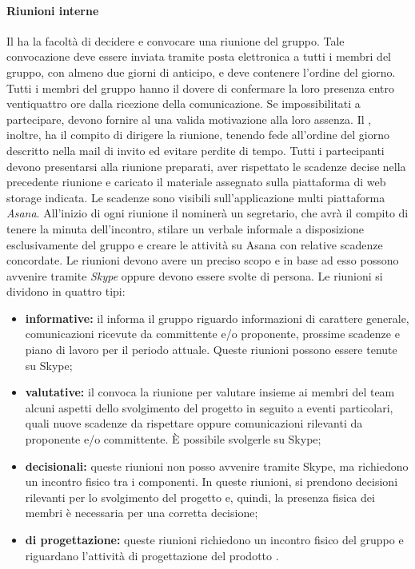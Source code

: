 			\paragraph{Riunioni interne}
			Il \textit{\RdP} ha la facoltà di decidere e convocare una riunione del gruppo. Tale convocazione deve essere inviata tramite posta elettronica a tutti i membri del gruppo, con almeno due giorni di anticipo, e deve contenere l'ordine del giorno. Tutti i membri del gruppo hanno il dovere di confermare la loro presenza entro ventiquattro ore dalla ricezione della comunicazione. Se impossibilitati a partecipare, devono fornire al \textit{\RdP} una valida motivazione alla loro assenza. Il \textit{\RdP}, inoltre, ha il compito di dirigere la riunione, tenendo fede all'ordine del giorno descritto nella mail di invito ed evitare perdite di tempo. Tutti i partecipanti devono presentarsi alla riunione preparati, aver rispettato le scadenze decise nella precedente riunione e caricato il materiale assegnato sulla piattaforma di web storage indicata. Le scadenze sono visibili sull'applicazione multi piattaforma \textit{Asana}.
			All’inizio di ogni riunione il \textit{\RdP} nominerà un segretario, che avrà il compito di tenere la minuta dell'incontro, stilare un verbale informale a disposizione esclusivamente del gruppo e creare le attività su Asana con relative scadenze concordate.  
			Le riunioni devono avere un preciso scopo e in base ad esso possono avvenire tramite \textit{Skype} oppure devono essere svolte di persona. Le riunioni si dividono in quattro tipi:
			\begin{itemize}
				\item \textbf{informative:} il \textit{\RdP} informa il gruppo riguardo informazioni di carattere generale, comunicazioni ricevute da committente e/o proponente, prossime scadenze e piano di lavoro per il periodo attuale. Queste riunioni possono essere tenute su Skype;
				\item \textbf{valutative:} il \textit{\RdP} convoca la riunione per valutare insieme ai membri del team alcuni aspetti dello svolgimento del progetto in seguito a eventi particolari, quali nuove scadenze da rispettare oppure comunicazioni rilevanti da proponente e/o committente. \MakeUppercase{è} possibile svolgerle su Skype;
				\item \textbf{decisionali:} queste riunioni non posso avvenire tramite Skype, ma richiedono un incontro fisico tra i componenti. In queste riunioni, si prendono decisioni rilevanti per lo svolgimento del progetto e, quindi, la presenza fisica dei membri è necessaria per una corretta decisione;
				\item \textbf{di progettazione:} queste riunioni richiedono un incontro fisico del gruppo e riguardano l'attività di progettazione del prodotto \progetto. 
			\end{itemize}
		
